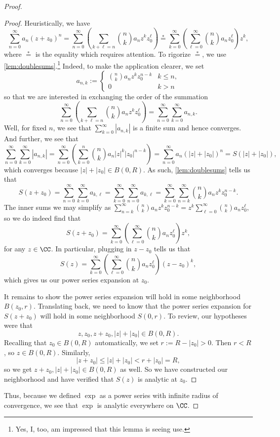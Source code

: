 \begin{proof}
\begin{proof}
		Heuristically, we have
		\[\sum_{n=0}^\infty a_n(z+z_0)^n=\sum_{n=0}^\infty\left(\sum_{k+\ell=n}\binom nka_nz^kz_0^\ell\right)\stackrel*=\sum_{k=0}^\infty\left(\sum_{\ell=0}^\infty\binom nka_nz_0^\ell\right)z^k,\]
		where $\stackrel*=$ is the equality which requires attention. To rigorize $\stackrel*=$, we use \autoref{lem:doublesums}.\footnote{Yes, I, too, am impressed that this lemma is seeing use.} Indeed, to make the application clearer, we set
		\[a_{n,k}:=\begin{cases}
			\binom nka_nz^kz_0^{n-k} & k\le n, \\
			0 & k>n
		\end{cases}\]
		so that we are interested in exchanging the order of the summation
		\[\sum_{n=0}^\infty\left(\sum_{k+\ell=n}\binom nka_nz^kz_0^\ell\right)=\sum_{n=0}^\infty\sum_{k=0}^\infty a_{n,k}.\]
		Well, for fixed $n$, we see that $\sum_{k=0}^\infty|a_{n,k}|$ is a finite sum and hence converges. And further, we see that
		\[\sum_{n=0}^\infty\sum_{k=0}^\infty|a_{n,k}|=\sum_{n=0}^\infty\left(\sum_{k=0}^n\binom nka_n|z|^k|z_0|^{n-k}\right)=\sum_{n=0}^\infty a_n(|z|+|z_0|)^n=S(|z|+|z_0|),\]
		which converges because $|z|+|z_0|\in B(0,R)$. As such, \autoref{lem:doublesums} tells us that
		\[S(z+z_0)=\sum_{n=0}^\infty\sum_{k=0}^\infty a_{k,\ell}=\sum_{k=0}^\infty\sum_{n=0}^\infty a_{k,\ell}=\sum_{k=0}^\infty\sum_{n=k}^\infty\binom nka_nz^kz_0^{n-k}.\]
		The inner sums we may simplify as $\sum_{n=k}^\infty\binom nka_nz^kz_0^{n-k}=z^k\sum_{\ell=0}^\infty\binom nka_nz_0^\ell$, so we do indeed find that
		\[S(z+z_0)=\sum_{k=0}^\infty\left(\sum_{\ell=0}^\infty\binom nka_nz_0^\ell\right)z^k,\]
		for any $z\in\CC$. In particular, plugging in $z-z_0$ tells us that
		\[S(z)=\sum_{k=0}^\infty\left(\sum_{\ell=0}^\infty\binom nka_nz_0^\ell\right)(z-z_0)^k,\]
		which gives us our power series expansion at $z_0$.
		
		It remains to show the power series expansion will hold in some neighborhood $B(z_0,r)$. Translating back, we need to know that the power series expansion for $S(z+z_0)$ will hold in some neighborhood $S(0,r)$. To review, our hypotheses were that
		\[z,z_0,z+z_0,|z|+|z_0|\in B(0,R).\]
		Recalling that $z_0\in B(0,R)$ automatically, we set $r:=R-|z_0|>0$. Then $r<R$, so $z\in B(0,R)$. Similarly,
		\[|z+z_0|\le|z|+|z_0|<r+|z_0|=R,\]
		so we get $z+z_0,|z|+|z_0|\in B(0,R)$ as well. So we have constructed our neighborhood and have verified that $S(z)$ is analytic at $z_0$.
	\end{proof}
	Thus, because we defined $\exp$ as a power series with infinite radius of convergence, we see that $\exp$ is analytic everywhere on $\CC$.
\end{proof}

